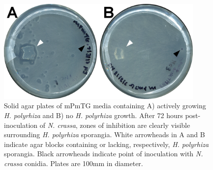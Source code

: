 \begin{figure}[hb]
  \centering
  \includegraphics[width=4in]{./Chapter_Inhibition/img/HpNc_avoidance.png}
  \caption[\textit{N. crassa} displays no avoidance behavior of solid agar blocks.]{Solid agar plates of mPmTG media containing A) actively growing \textit{H. polyrhiza} and B) no \textit{H. polyrhiza} growth. After 72 hours post-inoculation of \textit{N. crassa}, zones of inhibition are clearly visible surrounding \textit{H. polyrhiza} sporangia. White arrowheads in A and B indicate agar blocks containing or lacking, respectively, \textit{H. polyrhiza} sporangia. Black arrowheads indicate point of inoculation with \textit{N. crassa} conidia. Plates are 100mm in diameter.}
  \label{fig:ChInhib_NcAvoidance}
\end{figure}



